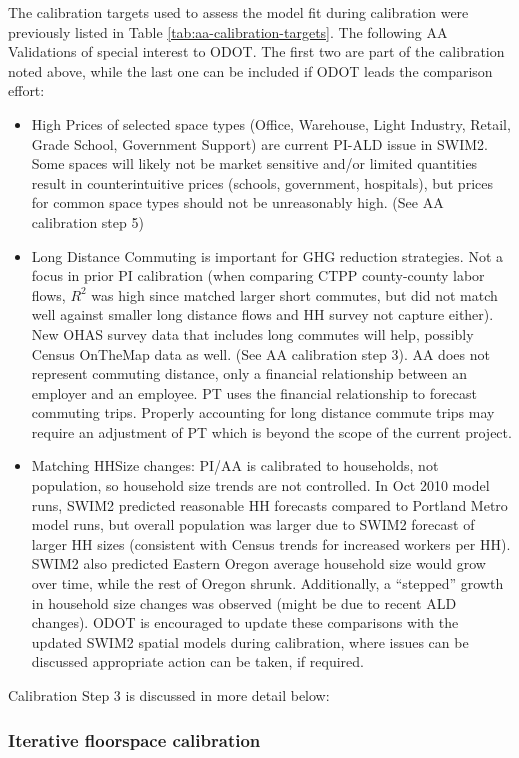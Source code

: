 The calibration targets used to assess the model fit during calibration were previously listed in Table \ref{tab:aa-calibration-targets}. The following AA Validations of special interest to ODOT. The first two are part of the calibration noted above, while the last one can be included if ODOT leads the comparison effort:
\begin{itemize}
\item High Prices of selected space types (Office, Warehouse, Light Industry, Retail, Grade School, Government Support) are current PI-ALD issue in SWIM2. Some spaces will likely not be market sensitive and/or limited quantities result in counterintuitive prices (schools, government, hospitals), but prices for common space types should not be unreasonably high. (See AA calibration step 5)
\item Long Distance Commuting is important for GHG reduction strategies. Not a focus in prior PI calibration (when comparing CTPP county-county labor flows, $R^2$ was high since matched larger short commutes, but did not match well against smaller long distance flows and HH survey not capture either). New OHAS survey data that includes long commutes will help, possibly Census OnTheMap data as well. (See AA calibration step 3). AA does not represent commuting distance, only a financial relationship between an employer and an employee. PT uses the financial relationship to forecast commuting trips. Properly accounting for long distance commute trips may require an adjustment of PT which is beyond the scope of the current project.  
\item Matching HHSize changes: PI/AA is calibrated to households, not population, so household size trends are not controlled. In Oct 2010 model runs, SWIM2 predicted reasonable HH forecasts compared to Portland Metro model runs, but overall population was larger due to SWIM2 forecast of larger HH sizes (consistent with Census trends for increased workers per HH). SWIM2 also predicted Eastern Oregon average household size would grow over time, while the rest of Oregon shrunk.  Additionally, a ``stepped'' growth in household size changes was observed (might be due to recent ALD changes). ODOT is encouraged to update these comparisons with the updated SWIM2 spatial models during calibration, where issues can be discussed appropriate action can be taken, if required.
\end{itemize}

Calibration Step 3 is discussed in more detail below:

\subsubsection{Iterative floorspace calibration}

